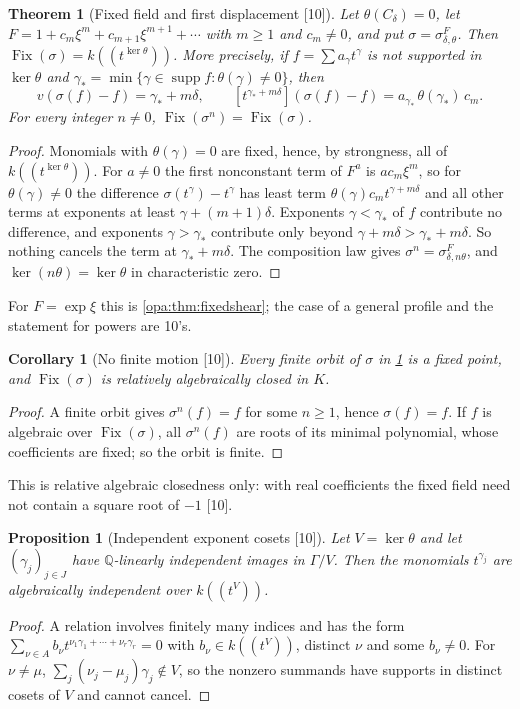\documentclass[11pt,oneside]{article}
\numberwithin{equation}{section}
\newtheorem{theorem}{Theorem}[section]
\newtheorem{proposition}[proposition]{Proposition}
\newtheorem{corollary}[corollary]{Corollary}
\theoremstyle{definition}
\theoremstyle{remark}
\newcommand{\Q}{\mathbb Q}
\newcommand{\supp}{\operatorname{supp}}
\newcommand{\Fix}{\operatorname{Fix}}
\newcommand{\Hahn}[2]{#1((t^{#2}))}
\newcommand{\coef}[2]{[t^{#1}]#2}
\newcommand{\src}[1]{\textup{\textsf{\small[#1]}}}
\begin{document}
\begin{theorem}[Fixed field and first displacement \src{10}]\label{opa:sc:thm:fixed}
Let $\theta(C_\delta)=0$, let $F=1+c_m\xi^m+c_{m+1}\xi^{m+1}+\cdots$ with $m\ge1$ and
$c_m\ne0$, and put $\sigma=\sigma^F_{\delta,\theta}$. Then
$\Fix(\sigma)=\Hahn k{\ker\theta}$. More precisely, if $f=\sum a_\gamma t^\gamma$ is not
supported in $\ker\theta$ and $\gamma_*=\min\{\gamma\in\supp f:\theta(\gamma)\ne0\}$, then
\[
 v(\sigma(f)-f)=\gamma_*+m\delta,\qquad
 \coef{\gamma_*+m\delta}{(\sigma(f)-f)}=a_{\gamma_*}\,\theta(\gamma_*)\,c_m .
\]
For every integer $n\ne0$, $\Fix(\sigma^n)=\Fix(\sigma)$.
\end{theorem}
\begin{proof}
Monomials with $\theta(\gamma)=0$ are fixed, hence, by strongness, all of
$\Hahn k{\ker\theta}$. For $a\ne0$ the first nonconstant term of $F^a$ is
$ac_m\xi^m$, so for $\theta(\gamma)\ne0$ the difference $\sigma(t^\gamma)-t^\gamma$ has
least term $\theta(\gamma)c_mt^{\gamma+m\delta}$ and all other terms at exponents at
least $\gamma+(m+1)\delta$. Exponents $\gamma<\gamma_*$ of $f$ contribute no difference,
and exponents $\gamma>\gamma_*$ contribute only beyond $\gamma+m\delta>\gamma_*+m\delta$. So
nothing cancels the term at $\gamma_*+m\delta$. The composition law gives
$\sigma^n=\sigma^F_{\delta,n\theta}$, and $\ker(n\theta)=\ker\theta$ in characteristic
zero.
\end{proof}

For $F=\exp\xi$ this is \cref{opa:thm:fixedshear}; the case of a general profile and
the statement for powers are 10's.

\begin{corollary}[No finite motion \src{10}]\label{opa:sc:cor:relative}
Every finite orbit of $\sigma$ in \cref{opa:sc:thm:fixed} is a fixed point, and
$\Fix(\sigma)$ is relatively algebraically closed in $K$.
\end{corollary}
\begin{proof}
A finite orbit gives $\sigma^n(f)=f$ for some $n\ge1$, hence $\sigma(f)=f$. If $f$ is
algebraic over $\Fix(\sigma)$, all $\sigma^n(f)$ are roots of its minimal polynomial,
whose coefficients are fixed; so the orbit is finite.
\end{proof}

This is relative algebraic closedness only: with real coefficients the fixed
field need not contain a square root of $-1$ \src{10}.

\begin{proposition}[Independent exponent cosets \src{10}]\label{opa:sc:prop:algind}
Let $V=\ker\theta$ and let $(\gamma_j)_{j\in J}$ have $\Q$-linearly independent images
in $\Gamma/V$. Then the monomials $t^{\gamma_j}$ are algebraically independent over
$\Hahn kV$.
\end{proposition}
\begin{proof}
A relation involves finitely many indices and has the form
$\sum_{\nu\in A}b_\nu t^{\nu_1\gamma_1+\cdots+\nu_r\gamma_r}=0$ with $b_\nu\in\Hahn kV$,
distinct $\nu$ and some $b_\nu\ne0$. For $\nu\ne\mu$,
$\sum_j(\nu_j-\mu_j)\gamma_j\notin V$, so the nonzero summands have supports in
distinct cosets of $V$ and cannot cancel.
\end{proof}
\end{document}
